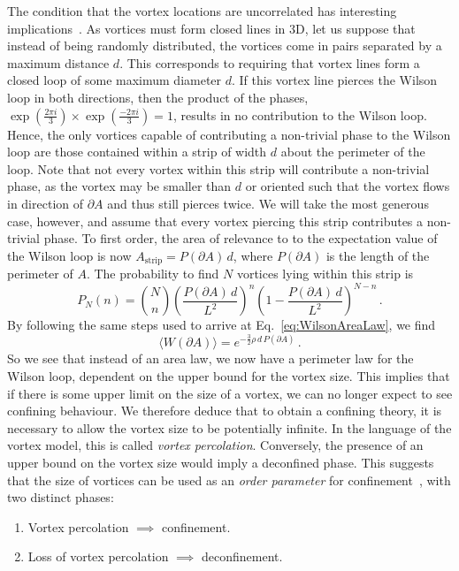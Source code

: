 The condition that the vortex locations are uncorrelated has interesting implications~\cite{Engelhardt:1999fd}. As vortices must form closed lines in 3D, let us suppose that instead of being randomly distributed, the vortices come in pairs separated by a maximum distance $d$. This corresponds to requiring that vortex lines form a closed loop of some maximum diameter $d$. If this vortex line pierces the Wilson loop in both directions, then the product of the phases, $\exp\left(\frac{2\pi i}{3}\right)\times \exp\left(\frac{-2\pi i}{3}\right) = 1$, results in no contribution to the Wilson loop. Hence, the only vortices capable of contributing a non-trivial phase to the Wilson loop are those contained within a strip of width $d$ about the perimeter of the loop. Note that not every vortex within this strip will contribute a non-trivial phase, as the vortex may be smaller than $d$ or oriented such that the vortex flows in direction of $\partial A$ and thus still pierces twice. We will take the most generous case, however, and assume that every vortex piercing this strip contributes a non-trivial phase. To first order, the area of relevance to to the expectation value of the Wilson loop is now $A_\text{strip}=P(\partial A)\, d$, where $P(\partial A)$ is the length of the perimeter of $A$. The probability to find $N$ vortices lying within this strip is 
%
\begin{equation}
P_N(n) = \binom{N}{n} \left(\frac{P(\partial A)\, d}{L^2}\right)^n \left(1-\frac{P(\partial A)\, d}{L^2}\right)^{N-n}\, .
\end{equation}
%
By following the same steps used to arrive at Eq.~\eqref{eq:WilsonAreaLaw}, we find
%
\begin{equation}
\langle W(\partial A)\rangle = e^{-\frac{3}{2}\rho\, d\, P(\partial A)}\, .
\end{equation}
%
So we see that instead of an area law, we now have a perimeter law for the Wilson loop, dependent on the upper bound for the vortex size. This implies that if there is some upper limit on the size of a vortex, we can no longer expect to see confining behaviour. We therefore deduce that to obtain a confining theory, it is necessary to allow the vortex size to be potentially infinite. In the language of the vortex model, this is called \textit{vortex percolation}. Conversely, the presence of an upper bound on the vortex size would imply a deconfined phase. This suggests that the size of vortices can be used as an \textit{order parameter} for confinement~\cite{Langfeld:1998cz}, with two distinct phases:
\begin{enumerate}
\item Vortex percolation $\implies$ confinement.
\item Loss of vortex percolation $\implies$ deconfinement.
\end{enumerate}


